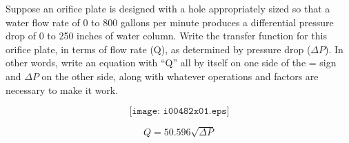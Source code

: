 

Suppose an orifice plate is designed with a hole appropriately sized so that a water flow rate of 0 to 800 gallons per minute produces a differential pressure drop of 0 to 250 inches of water column.  Write the transfer function for this orifice plate, in terms of flow rate (Q), as determined by pressure drop ($\Delta P$).  In other words, write an equation with ``Q'' all by itself on one side of the = sign and $\Delta P$ on the other side, along with whatever operations and factors are necessary to make it work.

$$\texttt{[image: i00482x01.eps]}$$







$$Q = 50.596 \sqrt{\Delta P}$$











